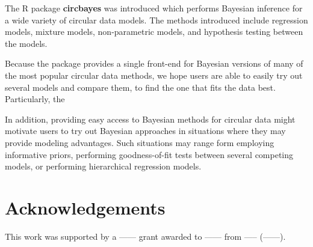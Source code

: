 \documentclass{article}
\let\proglang=\textsf
\newcommand{\pkg}[1]{\textbf{#1}}
\begin{document}
		The \proglang{R} package \pkg{circbayes} was introduced which performs
		Bayesian inference for a wide variety of circular data models. The
		methods introduced include regression models, mixture models,
		non-parametric models, and hypothesis testing between the models.
		
		Because the package provides a single front-end for Bayesian versions of
		many of the most popular circular data methods, we hope users are able
		to easily try out several models and compare them, to find the one that
		fits the data best. Particularly, the
		
		In addition, providing easy access to Bayesian methods for circular data
		might motivate users to try out Bayesian approaches in situations where
		they may provide modeling advantages. Such situations may range form
		employing informative priors, performing goodness-of-fit tests between
		several competing models, or performing hierarchical regression models.
		
		\hypertarget{acknowledgements}{%
			\section{Acknowledgements}\label{acknowledgements}}
		
		This work was supported by a ------ grant awarded to ------ from -----
		(------).
		




\end{document}
